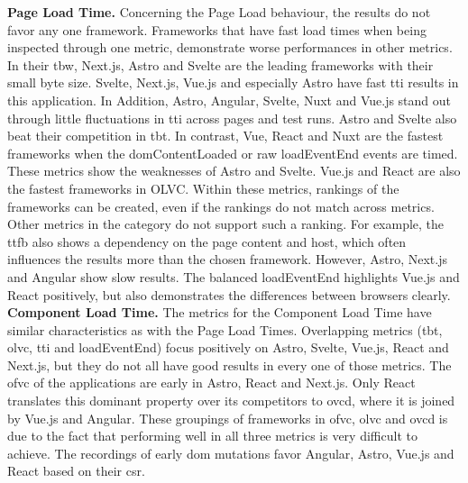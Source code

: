 \documentclass[a4paper, 12pt]{article}
\begin{document}
\textbf{Page Load Time.} Concerning the Page Load behaviour, the results do not favor any one framework.
Frameworks that have fast load times when being inspected through one metric, demonstrate worse performances in other metrics.
In their \acrlong{tbw}, Next.js, Astro and Svelte are the leading frameworks with their small byte size.
Svelte, Next.js, Vue.js and especially Astro have fast \acrlong{tti} results in this application.
In Addition, Astro, Angular, Svelte, Nuxt and Vue.js stand out through little fluctuations in \acrshort{tti} across pages and test runs.
Astro and Svelte also beat their competition in \acrlong{tbt}.
In contrast, Vue, React and Nuxt are the fastest frameworks when the domContentLoaded or raw loadEventEnd events are timed.
These metrics show the weaknesses of Astro and Svelte.
Vue.js and React are also the fastest frameworks in OLVC.
Within these metrics, rankings of the frameworks can be created, even if the rankings do not match across metrics.
Other metrics in the category do not support such a ranking.
For example, the \acrlong{ttfb} also shows a dependency on the page content and host, which often influences the results more than the chosen framework.
However, Astro, Next.js and Angular show slow results.
The balanced loadEventEnd highlights Vue.js and React positively, but also demonstrates the differences between browsers clearly.
\\

\textbf{Component Load Time.} The metrics for the Component Load Time have similar characteristics as with the Page Load Times.
Overlapping metrics (\acrshort{tbt}, \acrshort{olvc}, \acrshort{tti} and loadEventEnd) focus positively on Astro, Svelte, Vue.js, React and Next.js, but they do not all have good results in every one of those metrics.
The \acrshort{ofvc} of the applications are early in Astro, React and Next.js.
Only React translates this dominant property over its competitors to \acrshort{ovcd}, where it is joined by Vue.js and Angular.
These groupings of frameworks in \acrshort{ofvc}, \acrshort{olvc} and \acrshort{ovcd} is due to the fact that performing well in all three metrics is very difficult to achieve.
The recordings of early \acrshort{dom} mutations favor Angular, Astro, Vue.js and React based on their \acrshort{csr}.
\\
\end{document}
